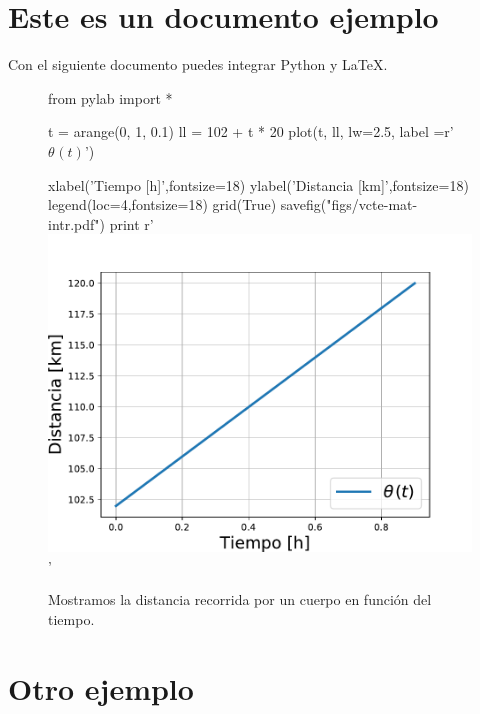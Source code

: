 \documentclass[12pt]{report}
\begin{document}
\section{Este es un documento ejemplo}

Con el siguiente documento puedes integrar Python y \LaTeX.

\begin{figure}[H]\centering%
\begin{python}
from pylab import *
	
t = arange(0, 1, 0.1)
ll = 102 + t * 20
plot(t, ll, lw=2.5, label =r'${\theta}_{}^{}(t) $')

xlabel('Tiempo [h]',fontsize=18)
ylabel('Distancia [km]',fontsize=18)
legend(loc=4,fontsize=18)
grid(True)
savefig("figs/vcte-mat-intr.pdf")
print r'\includegraphics[scale=0.4]{figs/vcte-mat-intr}'

\end{python}
\caption{\label{fig:vcte-mat-intr}
Mostramos la distancia recorrida por un cuerpo en funci\'on del 
tiempo.}
  \end{figure}



\section{Otro ejemplo}
\end{document}
